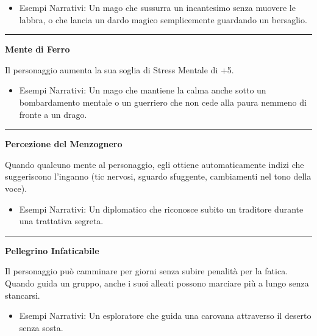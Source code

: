 \documentclass[../manuale_main.tex]{subfiles}
\begin{document}
\begin{itemize}
\item Esempi Narrativi: Un mago che sussurra un incantesimo senza muovere le labbra, o che lancia un dardo magico semplicemente guardando un bersaglio.
\end{itemize}

\vspace{0.5cm}\rule{\textwidth}{0.4pt}\vspace{1cm}

\begin{center}
\textbf{\large{Mente di Ferro}}\\
\end{center}
Il personaggio aumenta la sua soglia di Stress Mentale di +5.

\begin{itemize}
\item Esempi Narrativi: Un mago che mantiene la calma anche sotto un bombardamento mentale o un guerriero che non cede alla paura nemmeno di fronte a un drago.
\end{itemize}

\vspace{0.5cm}\rule{\textwidth}{0.4pt}\vspace{1cm}

\begin{center}
\textbf{\large{Percezione del Menzognero}}\\
\end{center}
Quando qualcuno mente al personaggio, egli ottiene automaticamente indizi che suggeriscono l’inganno (tic nervosi, sguardo sfuggente, cambiamenti nel tono della voce).

\begin{itemize}
\item Esempi Narrativi: Un diplomatico che riconosce subito un traditore durante una trattativa segreta.
\end{itemize}

\vspace{0.5cm}\rule{\textwidth}{0.4pt}\vspace{1cm}

\begin{center}
\textbf{\large{Pellegrino Infaticabile}}\\
\end{center}
Il personaggio può camminare per giorni senza subire penalità per la fatica. Quando guida un gruppo, anche i suoi alleati possono marciare più a lungo senza stancarsi.

\begin{itemize}
\item Esempi Narrativi: Un esploratore che guida una carovana attraverso il deserto senza sosta.
\end{itemize}
\end{document}
